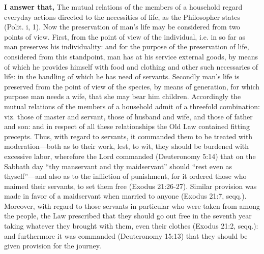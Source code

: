\textbf{I answer that,} The mutual relations of the members of a household regard everyday actions directed to the necessities of life, as the Philosopher states (Polit. i, 1). Now the preservation of man's life may be considered from two points of view. First, from the point of view of the individual, i.e. in so far as man preserves his individuality: and for the purpose of the preservation of life, considered from this standpoint, man has at his service external goods, by means of which he provides himself with food and clothing and other such necessaries of life: in the handling of which he has need of servants. Secondly man's life is preserved from the point of view of the species, by means of generation, for which purpose man needs a wife, that she may bear him children. Accordingly the mutual relations of the members of a household admit of a threefold combination: viz. those of master and servant, those of husband and wife, and those of father and son: and in respect of all these relationships the Old Law contained fitting precepts. Thus, with regard to servants, it commanded them to be treated with moderation—both as to their work, lest, to wit, they should be burdened with excessive labor, wherefore the Lord commanded (Deuteronomy 5:14) that on the Sabbath day ``thy manservant and thy maidservant'' should ``rest even as thyself''—and also as to the infliction of punishment, for it ordered those who maimed their servants, to set them free (Exodus 21:26-27). Similar provision was made in favor of a maidservant when married to anyone (Exodus 21:7, seqq.). Moreover, with regard to those servants in particular who were taken from among the people, the Law prescribed that they should go out free in the seventh year taking whatever they brought with them, even their clothes (Exodus 21:2, seqq.): and furthermore it was commanded (Deuteronomy 15:13) that they should be given provision for the journey.

